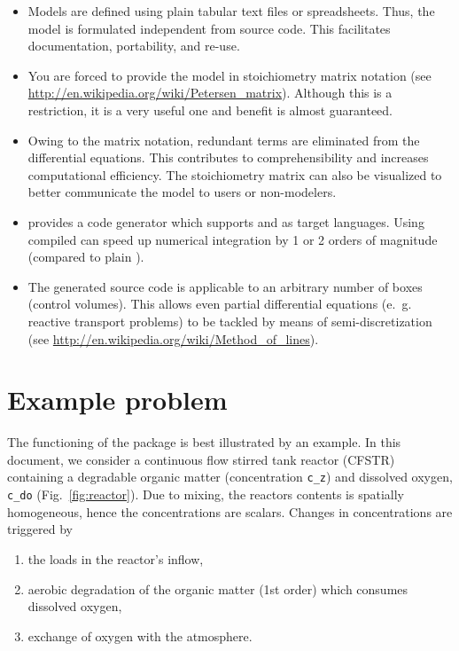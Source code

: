 \documentclass[times,onecolumn]{article}
\begin{document}
\begin{itemize}
\item Models are defined using plain tabular text files or spreadsheets. Thus, the model is formulated independent from source code. This facilitates documentation, portability, and re-use.
\item You are forced to provide the model in stoichiometry matrix notation (see \url{http://en.wikipedia.org/wiki/Petersen_matrix}). Although this is a restriction, it is a very useful one and benefit is almost guaranteed.
\item Owing to the matrix notation, redundant terms are eliminated from the differential equations. This contributes to comprehensibility and increases computational efficiency. The stoichiometry matrix can also be visualized to better communicate the model to users or non-modelers.
\item {} provides a code generator which supports  and  as target languages. Using compiled  can speed up numerical integration by 1 or 2 orders of magnitude (compared to plain ).
\item The generated source code is applicable to an arbitrary number of boxes (control volumes). This allows even partial differential equations (e.~g. reactive transport problems) to be tackled by means of semi-discretization  (see \url{http://en.wikipedia.org/wiki/Method_of_lines}).
\end{itemize}

\section{Example problem}
The functioning of the package is best illustrated by an example. In this document, we consider a continuous flow stirred tank reactor (CFSTR) containing a degradable organic matter (concentration \verb|c_z|) and dissolved oxygen, \verb|c_do| (Fig.~\ref{fig:reactor}). Due to mixing, the reactors contents is spatially homogeneous, hence the concentrations are scalars. Changes in concentrations are triggered by
\begin{enumerate}
\item the loads in the reactor's inflow,
\item aerobic degradation of the organic matter (1st order) which consumes dissolved oxygen,
\item exchange of oxygen with the atmosphere.
\end{enumerate}
\end{document}
